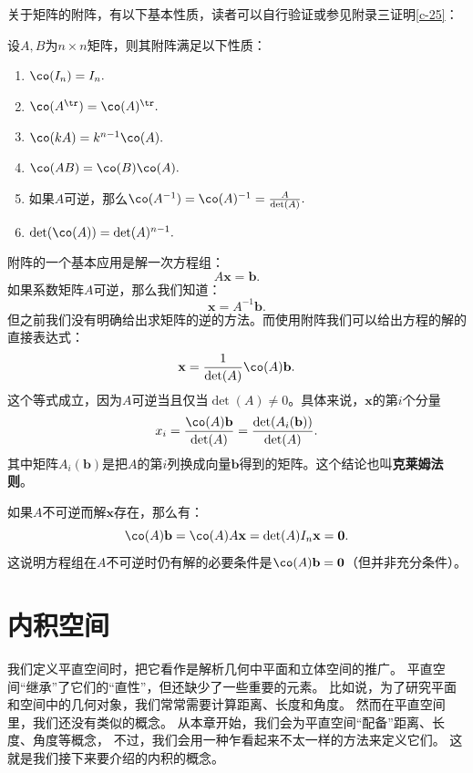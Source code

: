 \documentclass[12pt,UTF8]{ctexbook}
\begin{document}
关于矩阵的附阵，有以下基本性质，读者可以自行验证或参见附录三证明\ref{c-25}：
\begin{pp}\label{pp:10_50}
    设$A,B$为$n\times n$矩阵，则其附阵满足以下性质：
    \begin{enumerate}
    \item $\co(I_n) = I_n.$
    \item $\co(A^{\tr}) = \co(A)^{\tr}.$
    \item $\co(kA) = k^{n-1}\co(A).$
    \item $\co(AB) = \co(B)\co(A). $
    \item 如果$A$可逆，那么$\co(A^{-1}) = \co(A)^{-1} = \frac{A}{\det(A)}.$
    \item $\det(\co(A)) = \det(A)^{n-1}.$
\end{enumerate}
\end{pp}

附阵的一个基本应用是解一次方程组：
$$ A\mathbf{x} = \mathbf{b}.$$
如果系数矩阵$A$可逆，那么我们知道：
$$ \mathbf{x} = A^{-1}\mathbf{b}.$$
但之前我们没有明确给出求矩阵的逆的方法。而使用附阵我们可以给出方程的解的直接表达式：
$$
    \mathbf{x} =  \frac{1}{\det(A)}\co(A)\mathbf{b}.
$$
这个等式成立，因为$A$可逆当且仅当$\det(A)\neq 0$。具体来说，$\mathbf{x}$的第$i$个分量
$$
x_i = \frac{\co(A)\mathbf{b}}{\det(A)} = \frac{\det(A_i(\mathbf{b}))}{\det(A)}. 
$$
其中矩阵$A_i(\mathbf{b})$是把$A$的第$i$列换成向量$\mathbf{b}$得到的矩阵。这个结论也叫\textbf{克莱姆法则}。

如果$A$不可逆而解$\mathbf{x}$存在，那么有：
$$
\co(A)\mathbf{b} = \co(A)A\mathbf{x} = \det(A)I_n\mathbf{x} = \mathbf{0}.
$$
这说明方程组在$A$不可逆时仍有解的必要条件是$\co(A)\mathbf{b} =\mathbf{0}$（但并非充分条件）。


\chapter{内积空间}
我们定义平直空间时，把它看作是解析几何中平面和立体空间的推广。
平直空间“继承”了它们的“直性”，但还缺少了一些重要的元素。
比如说，为了研究平面和空间中的几何对象，我们常常需要计算距离、长度和角度。
然而在平直空间里，我们还没有类似的概念。
从本章开始，我们会为平直空间“配备”距离、长度、角度等概念，
不过，我们会用一种乍看起来不太一样的方法来定义它们。
这就是我们接下来要介绍的内积的概念。

\begin{center}
\end{center}
\end{document}

